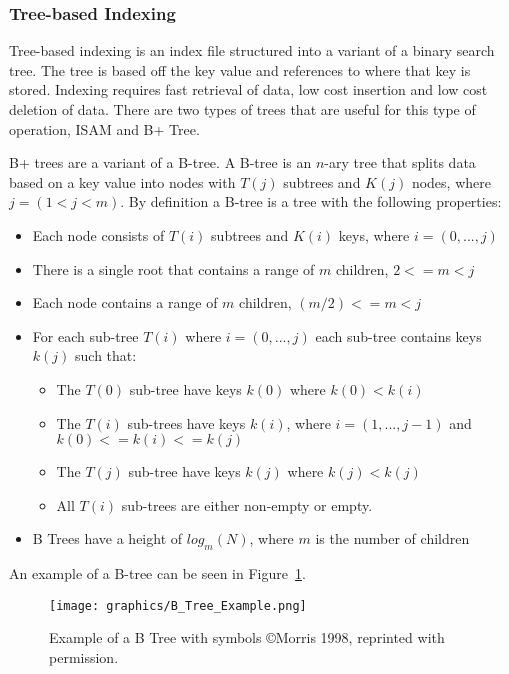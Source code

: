 \documentclass[letterpaper, 12pt]{article}
\begin{document}
\subsubsection{Tree-based Indexing}
Tree-based indexing is an index file structured into a variant of a binary search tree. The tree is based off
the key value and references to where that key is stored. Indexing requires fast retrieval of data, low cost
insertion and low cost deletion of data. There are two types of trees that are useful for this type of operation,
ISAM and B+ Tree.
\par\vspace{\baselineskip}

B+ trees are a variant of a B-tree. A B-tree is an $n$-ary tree that splits data
based on a key value into nodes with $T(j)$ subtrees and $K(j)$ nodes, where $j = (1<j<m)$.
By definition a B-tree is a tree with the following properties:
\begin{itemize}
  \item Each node consists of $T(i)$ subtrees and $K(i)$ keys, where $i = (0,...,j)$
  \item There is a single root that contains a range of $m$ children, $2<= m < j$
  \item Each node contains a range of $m$ children, $(m/2) <= m < j$
  \item For each sub-tree $T(i)$ where $i = (0,...,j)$ each sub-tree contains keys $k(j)$ such that:
  \begin{itemize}
    \item The $T(0)$ sub-tree have keys $k(0)$ where $k(0) < k(i)$
    \item The $T(i)$ sub-trees have keys $k(i)$, where $i = (1, ..., j-1)$ and $k(0) <= k(i) <= k(j)$
    \item The $T(j)$ sub-tree have keys $k(j)$ where $k(j) < k(j)$
    \item All $T(i)$ sub-trees are either non-empty or empty.
  \end{itemize}
  \item B Trees have a height of $log_m(N)$, where $m$ is the number of children
\end{itemize}
An example of a B-tree can be seen in Figure~\ref{fig:b_tree_ex}.

\begin{figure}[H]
  \centering
  \texttt{[image: graphics/B\_Tree\_Example.png]}
  \caption{Example of a B Tree with symbols \copyright Morris 1998, reprinted with permission.\cite{b+tree}}
  \label{fig:b_tree_ex}
\end{figure}
\end{document}
